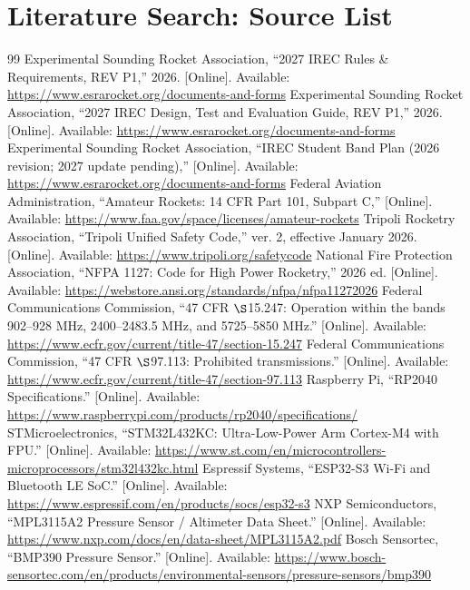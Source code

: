 \documentclass[11pt]{IEEEtran}
\begin{document}
\section{Literature Search: Source List}
\begingroup\small
\begin{thebibliography}{99}
 Experimental Sounding Rocket Association, ``2027 IREC Rules \& Requirements, REV P1,'' 2026. [Online]. Available: \url{https://www.esrarocket.org/documents-and-forms}
 Experimental Sounding Rocket Association, ``2027 IREC Design, Test and Evaluation Guide, REV P1,'' 2026. [Online]. Available: \url{https://www.esrarocket.org/documents-and-forms}
 Experimental Sounding Rocket Association, ``IREC Student Band Plan (2026 revision; 2027 update pending),'' [Online]. Available: \url{https://www.esrarocket.org/documents-and-forms}
 Federal Aviation Administration, ``Amateur Rockets: 14 CFR Part 101, Subpart C,'' [Online]. Available: \url{https://www.faa.gov/space/licenses/amateur-rockets}
 Tripoli Rocketry Association, ``Tripoli Unified Safety Code,'' ver. 2, effective January 2026. [Online]. Available: \url{https://www.tripoli.org/safetycode}
 National Fire Protection Association, ``NFPA 1127: Code for High Power Rocketry,'' 2026 ed. [Online]. Available: \url{https://webstore.ansi.org/standards/nfpa/nfpa11272026}
 Federal Communications Commission, ``47 CFR $\S$15.247: Operation within the bands 902--928 MHz, 2400--2483.5 MHz, and 5725--5850 MHz.'' [Online]. Available: \url{https://www.ecfr.gov/current/title-47/section-15.247}
 Federal Communications Commission, ``47 CFR $\S$97.113: Prohibited transmissions.'' [Online]. Available: \url{https://www.ecfr.gov/current/title-47/section-97.113}
 Raspberry Pi, ``RP2040 Specifications.'' [Online]. Available: \url{https://www.raspberrypi.com/products/rp2040/specifications/}
 STMicroelectronics, ``STM32L432KC: Ultra-Low-Power Arm Cortex-M4 with FPU.'' [Online]. Available: \url{https://www.st.com/en/microcontrollers-microprocessors/stm32l432kc.html}
 Espressif Systems, ``ESP32-S3 Wi-Fi and Bluetooth LE SoC.'' [Online]. Available: \url{https://www.espressif.com/en/products/socs/esp32-s3}
 NXP Semiconductors, ``MPL3115A2 Pressure Sensor / Altimeter Data Sheet.'' [Online]. Available: \url{https://www.nxp.com/docs/en/data-sheet/MPL3115A2.pdf}
 Bosch Sensortec, ``BMP390 Pressure Sensor.'' [Online]. Available: \url{https://www.bosch-sensortec.com/en/products/environmental-sensors/pressure-sensors/bmp390}

\end{thebibliography}
\end{document}
